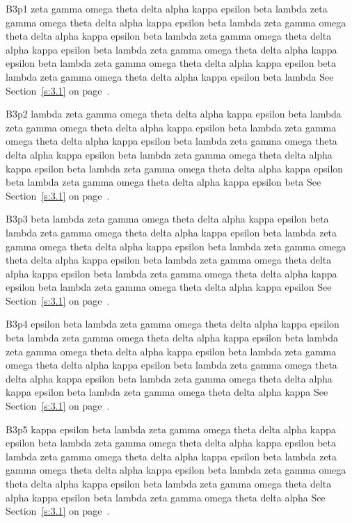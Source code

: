 B3p1 zeta gamma omega theta delta alpha kappa epsilon beta lambda zeta gamma omega theta delta alpha kappa epsilon beta lambda zeta gamma omega theta delta alpha kappa epsilon beta lambda zeta gamma omega theta delta alpha kappa epsilon beta lambda zeta gamma omega theta delta alpha kappa epsilon beta lambda zeta gamma omega theta delta alpha kappa epsilon beta lambda zeta gamma omega theta delta alpha kappa epsilon beta lambda See Section~\ref{s:3.1} on page~\pageref{s:3.1}.

B3p2 lambda zeta gamma omega theta delta alpha kappa epsilon beta lambda zeta gamma omega theta delta alpha kappa epsilon beta lambda zeta gamma omega theta delta alpha kappa epsilon beta lambda zeta gamma omega theta delta alpha kappa epsilon beta lambda zeta gamma omega theta delta alpha kappa epsilon beta lambda zeta gamma omega theta delta alpha kappa epsilon beta lambda zeta gamma omega theta delta alpha kappa epsilon beta See Section~\ref{s:3.1} on page~\pageref{s:3.1}.

B3p3 beta lambda zeta gamma omega theta delta alpha kappa epsilon beta lambda zeta gamma omega theta delta alpha kappa epsilon beta lambda zeta gamma omega theta delta alpha kappa epsilon beta lambda zeta gamma omega theta delta alpha kappa epsilon beta lambda zeta gamma omega theta delta alpha kappa epsilon beta lambda zeta gamma omega theta delta alpha kappa epsilon beta lambda zeta gamma omega theta delta alpha kappa epsilon See Section~\ref{s:3.1} on page~\pageref{s:3.1}.

B3p4 epsilon beta lambda zeta gamma omega theta delta alpha kappa epsilon beta lambda zeta gamma omega theta delta alpha kappa epsilon beta lambda zeta gamma omega theta delta alpha kappa epsilon beta lambda zeta gamma omega theta delta alpha kappa epsilon beta lambda zeta gamma omega theta delta alpha kappa epsilon beta lambda zeta gamma omega theta delta alpha kappa epsilon beta lambda zeta gamma omega theta delta alpha kappa See Section~\ref{s:3.1} on page~\pageref{s:3.1}.

B3p5 kappa epsilon beta lambda zeta gamma omega theta delta alpha kappa epsilon beta lambda zeta gamma omega theta delta alpha kappa epsilon beta lambda zeta gamma omega theta delta alpha kappa epsilon beta lambda zeta gamma omega theta delta alpha kappa epsilon beta lambda zeta gamma omega theta delta alpha kappa epsilon beta lambda zeta gamma omega theta delta alpha kappa epsilon beta lambda zeta gamma omega theta delta alpha See Section~\ref{s:3.1} on page~\pageref{s:3.1}.


